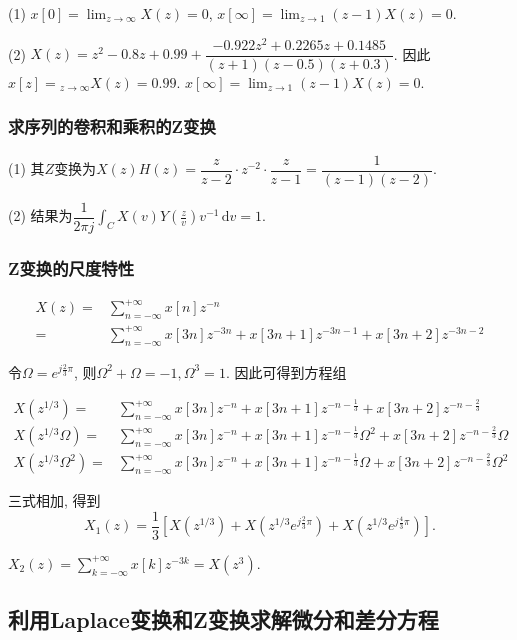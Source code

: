 (1) $x[0]=\displaystyle\lim_{z\to\infty}X(z)=0$, $x[\infty]=\displaystyle\lim_{z\to1}(z-1)X(z)=0$.

(2) $X(z)=z^2-0.8z+0.99+\dfrac{-0.922z^2+0.2265z+0.1485}{(z+1)(z-0.5)(z+0.3)}$. 因此$x[z]=\displaystyle_{z\to\infty}X(z)=0.99$. $x[\infty]=\displaystyle\lim_{z\to1}(z-1)X(z)=0$.

\subsubsection{求序列的卷积和乘积的Z变换}

(1) 其$Z$变换为$X(z)H(z)=\dfrac{z}{z-2}\cdot z^{-2}\cdot\dfrac{z}{z-1}=\dfrac{1}{(z-1)(z-2)}$.

(2) 结果为$\dfrac{1}{2\pi j}\displaystyle\int_{C}^{}X(v)Y(\frac{z}{v})v^{-1}\,\mathrm{d}v=1$.

\subsubsection{Z变换的尺度特性}

\begin{align*}
    X(z)=&\sum_{n=-\infty}^{+\infty}x[n]z^{-n} \\
    =&\sum_{n=-\infty}^{+\infty}x[3n]z^{-3n}+x[3n+1]z^{-3n-1}+x[3n+2]z^{-3n-2}
\end{align*}

令$\Omega=e^{j\frac{2}{3}\pi}$, 则$\Omega^2+\Omega=-1,\Omega^3=1$. 因此可得到方程组

\begin{align*}
    X(z^{1/3})=&\sum_{n=-\infty}^{+\infty}x[3n]z^{-n}+x[3n+1]z^{-n-\frac{1}{3}}+x[3n+2]z^{-n-\frac{2}{3}} \\
    X(z^{1/3}\Omega)=&\sum_{n=-\infty}^{+\infty}x[3n]z^{-n}+x[3n+1]z^{-n-\frac{1}{3}}\Omega^2+x[3n+2]z^{-n-\frac{2}{3}}\Omega \\
    X(z^{1/3}\Omega^2)=&\sum_{n=-\infty}^{+\infty}x[3n]z^{-n}+x[3n+1]z^{-n-\frac{1}{3}}\Omega+x[3n+2]z^{-n-\frac{2}{3}}\Omega^2
\end{align*}

三式相加, 得到$$X_1(z)=\displaystyle\frac{1}{3}\left[X(z^{1/3})+X(z^{1/3}e^{j\frac{2}{3}\pi})+X(z^{1/3}e^{j\frac{4}{3}\pi})\right].$$

$X_2(z)=\displaystyle\sum_{k=-\infty}^{+\infty}x[k]z^{-3k}=X(z^{3})$.

\subsection{利用Laplace变换和Z变换求解微分和差分方程}

